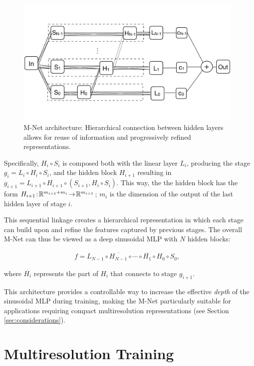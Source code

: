 \begin{figure}[!h]
    \centering
    \includegraphics[width=0.75\linewidth]{img/ch4/mnet.pdf}
    \caption{M-Net architecture: Hierarchical connection between hidden layers allows for reuse of information and progressively refined representations.}
    \label{f:m-net}
\end{figure}
    
Specifically, $H_i\circ  S_i$ is composed both with the linear layer $L_i$, producing the stage $g_i\! =\! L_i\!\circ\! H_i\!\circ\!  S_i$, and the hidden block $H_{i+1}$ resulting in $g_{i+1}\! =\! L_{i+1}\!\circ H_{i+1}\!\circ\left(S_{i+1}, H_i\circ  S_i\right)$. This way, the the hidden block has the form $H_{i+1}\!:\!\mathbb{R}^{m_{i+1} + m_i}\!\to\! \mathbb{R}^{m_{i+1}}$; $m_i$ is the dimension of the output of the last hidden layer of stage $i$. 

This sequential linkage creates a hierarchical representation in which each stage can build upon and refine the features captured by previous stages. The overall M-Net can thus be viewed as a deep sinusoidal MLP with \( N \) hidden blocks:

\begin{align}
    f = L_{N-1} \circ \overline{H_{N-1}} \circ \cdots \circ \overline{H_1} \circ H_0 \circ S_0,
\end{align}

where \( \overline{H_i} \) represents the part of \( H_i \) that connects to stage \( g_{i+1} \).

This architecture provides a controllable way to increase the effective \textit{depth} of the sinusoidal MLP during training, making the M-Net particularly suitable for applications requiring compact multiresolution representations (see Section \ref{sec:considerations}).



\section{Multiresolution Training}\label{sec:mr_training}
\label{s:training}

